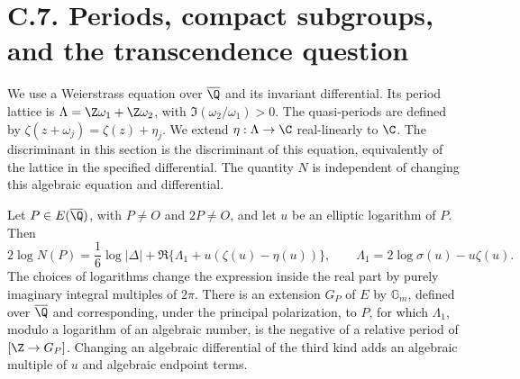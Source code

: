 \section{C.7. Periods, compact subgroups, and the transcendence question}

We use a Weierstrass equation over $\overline\Q$ and its invariant
differential. Its period lattice is $\Lambda=\Z\omega_1+\Z\omega_2$,
with $\Im(\omega_2/\omega_1)>0$. The quasi-periods are defined by
$\zeta(z+\omega_j)=\zeta(z)+\eta_j$. We extend
$\eta:\Lambda\to\C$ real-linearly to $\C$. The discriminant in
this section is the discriminant of this equation, equivalently of
the lattice in the specified differential. The quantity $N$ is
independent of changing this algebraic equation and differential.

\begin{proposition}\label{ari:C.7.1}
Let $P\in E(\overline\Q)$, with $P\ne O$ and $2P\ne O$, and
let $u$ be an elliptic logarithm of $P$. Then
\begin{equation}\label{ari:eq:cp-sigma}
 2\log N(P)=\frac16\log|\Delta|
       +\Re\{\Lambda_1+u(\zeta(u)-\eta(u))\},
 \qquad \Lambda_1=2\log\sigma(u)-u\zeta(u).
\end{equation}
The choices of logarithms change the expression inside the real
part by purely imaginary integral multiples of $2\pi$.
There is an extension $G_P$ of $E$ by $\mathbb G_m$, defined
over $\overline\Q$ and corresponding, under the principal
polarization, to $P$, for which $\Lambda_1$, modulo a logarithm
of an algebraic number, is the negative of a relative period
of $[\Z\to G_P]$. Changing an algebraic differential of the
third kind adds an algebraic multiple of $u$ and algebraic
endpoint terms.
\end{proposition}
